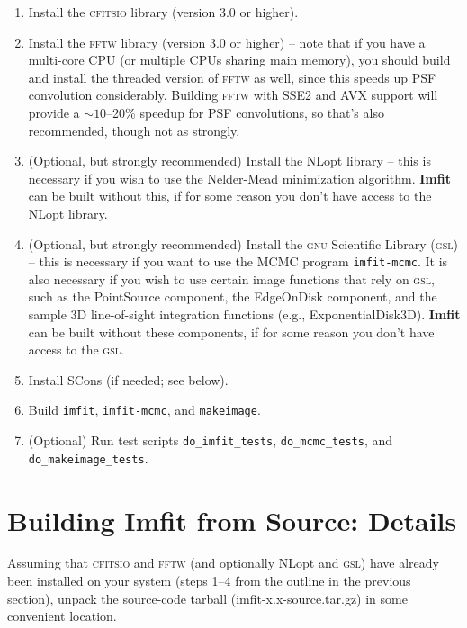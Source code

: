 \documentclass[10pt,a4paper,article]{memoir}
\newcommand{\Imfit}{\textbf{Imfit}}
\newcommand{\imfitprog}{\texttt{imfit}}
\newcommand{\imfitmcmc}{\texttt{imfit-mcmc}}
\newcommand{\makeimage}{\texttt{makeimage}}
\begin{document}
\begin{enumerate}
\item Install the \textsc{cfitsio} library (version 3.0 or higher).

\item Install the \textsc{fftw} library (version 3.0 or higher) -- note
that if you have a multi-core CPU (or multiple CPUs sharing main
memory), you should build and install the threaded version of
\textsc{fftw} as well, since this speeds up PSF convolution
considerably. Building \textsc{fftw} with SSE2 and AVX support will
provide a $\sim 10$--20\% speedup for PSF convolutions, so that's also
recommended, though not as strongly.

\item (Optional, but strongly recommended) Install the NLopt library --
this is necessary if you wish to use the Nelder-Mead minimization
algorithm. \Imfit{} can be built without this, if for some reason
you don't have access to the NLopt library.

\item (Optional, but strongly recommended) Install the \textsc{gnu}
Scientific Library (\textsc{gsl}) -- this is necessary if you want to
use the MCMC program \imfitmcmc. It is also necessary if you wish to use
certain image functions that rely on \textsc{gsl}, such as the
PointSource component, the EdgeOnDisk component, and the sample 3D
line-of-sight integration functions (e.g., ExponentialDisk3D). \Imfit{}
can be built without these components, if for some reason you don't have
access to the \textsc{gsl}.

\item Install SCons (if needed; see below).

\item Build \imfitprog, \imfitmcmc, and \makeimage.

\item (Optional) Run test scripts \texttt{do\_imfit\_tests}, \texttt{do\_mcmc\_tests},
and \texttt{do\_makeimage\_tests}.

\end{enumerate}



\section{Building \Imfit{} from Source: Details}\label{sec:build}

Assuming that \textsc{cfitsio} and \textsc{fftw} (and optionally NLopt
and \textsc{gsl}) have already been installed on your system (steps 1--4
from the outline in the previous section), unpack the source-code
tarball (imfit-x.x-source.tar.gz) in some convenient location.
\end{document}
